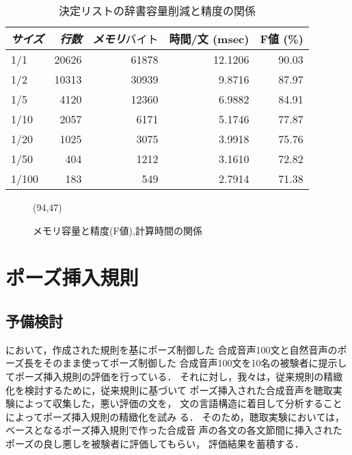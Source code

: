 \begin{table*}
\caption{決定リストの辞書容量削減と精度の関係}
\label{決定リストの辞書容量削減と精度の関係}
\begin{center}
\begin{tabular}{lrrrr} \hline
	{\it サイズ} &	{\it 行数} &	{\it メモリ\(バイト\)} &
        {時間/文 (msec)} & {F値 (\%)} \\ \hline
   1/1		& 20626	&   61878	&   12.1206 &	 90.03\\
   1/2		& 10313	&   30939	&    9.8716 &	 87.97\\
   1/5		&  4120	&   12360	&    6.9882 &	 84.91\\
   1/10		&  2057	&    6171	&    5.1746 &	 77.87\\
   1/20		&  1025	&    3075	&    3.9918 &	 75.76\\
   1/50		&   404	&    1212	&    3.1610 &	 72.82\\
   1/100	&   183	&     549	&    2.7914 &	 71.38\\ \hline
\end{tabular}
\end{center}
\end{table*}

\begin{figure}[t]
  \begin{center}
	\atari(94,47)
    \caption{メモリ容量と精度(F値),計算時間の関係}
    \vspace{-5mm}
  \end{center}
\end{figure}

\section{ポーズ挿入規則}

\subsection{予備検討}

\cite{海木1996}において，作成された規則を基にポーズ制御した
合成音声100文と自然音声のポーズ長をそのまま使ってポーズ制御した
合成音声100文を10名の被験者に提示してポーズ挿入規則の評価を行っている．
それに対し，我々は，従来規則の精緻化を検討するために，従来規則に基づいて
ポーズ挿入された合成音声を聴取実験によって収集した，悪い評価の文を，
文の言語構造に着目して分析することによってポーズ挿入規則の精緻化を試み
る．
そのため，聴取実験においては，ベースとなるポーズ挿入規則で作った合成音
声の各文の各文節間に挿入されたポーズの良し悪しを被験者に評価してもらい，
評価結果を蓄積する．

